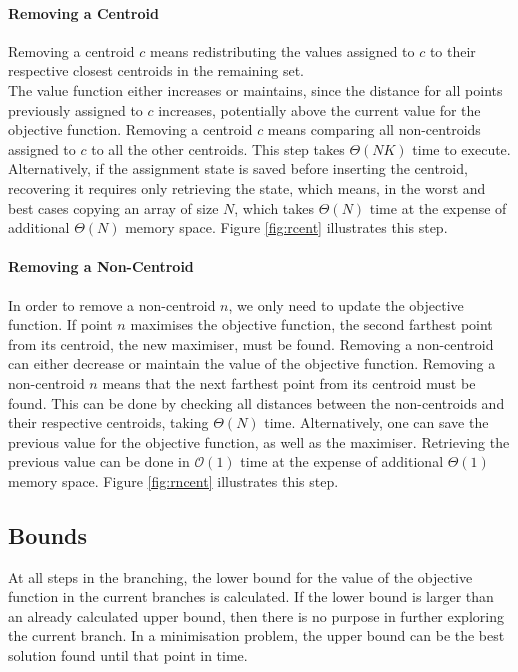 \paragraph{Removing a Centroid}
Removing a centroid $c$ means redistributing the values assigned to $c$ to their respective closest centroids in the remaining set. \\
The value function either increases or maintains, since the distance for all points previously assigned to $c$ increases, potentially above the current value for the objective function.
Removing a centroid $c$ means comparing all non-centroids assigned to $c$ to all the other centroids. This step takes $\Theta(NK)$ time to execute. Alternatively, if the assignment state is saved before inserting the centroid, recovering it requires only retrieving the state, which means, in the worst and best cases copying an array of size $N$, which takes $\Theta(N)$ time at the expense of additional $\Theta(N)$ memory space. Figure \ref{fig:rcent} illustrates this step.



\paragraph{Removing a Non-Centroid}
In order to remove a non-centroid $n$, we only need to update the objective function. If point $n$ maximises the objective function, the second farthest point from its centroid, the new maximiser, must be found.
Removing a non-centroid can either decrease or maintain the value of the objective function.
Removing a non-centroid $n$ means that the next farthest point from its centroid must be found. This can be done by checking all distances between the non-centroids and their respective centroids, taking $\Theta(N)$ time. Alternatively, one can save the previous value for the objective function, as well as the maximiser. Retrieving the previous value can be done in $\mathcal{O}(1)$ time at the expense of additional $\Theta(1)$ memory space. Figure \ref{fig:rncent} illustrates this step.



\subsection{Bounds}
\label{sec:bounds}
At all steps in the branching, the lower bound for the value of the objective function in the current branches is calculated. If the lower bound is larger than an already calculated upper bound, then there is no purpose in further exploring the current branch. In a minimisation problem, the upper bound can be the best solution found until that point in time.

